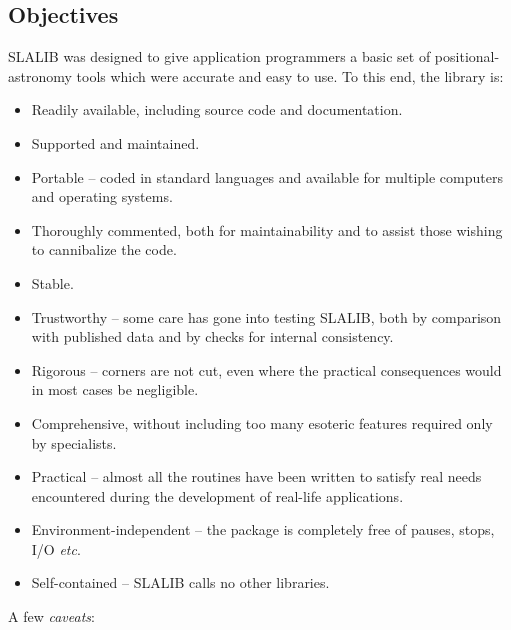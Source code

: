 \subsection{Objectives}
SLALIB was designed to give application programmers
a basic set of positional-astronomy tools which were
accurate and easy to use.  To this end, the library is:
\begin{itemize}
\item Readily available, including source code and documentation.
\item Supported and maintained.
\item Portable -- coded in standard languages and available for
multiple computers and operating systems.
\item Thoroughly commented, both for maintainability and to
assist those wishing to cannibalize the code.
\item Stable.
\item Trustworthy -- some care has gone into
testing SLALIB, both by comparison with published data and
by checks for internal consistency.
\item Rigorous -- corners are not cut,
even where the practical consequences would in most cases be
negligible.
\item Comprehensive, without including too many esoteric features
required only by specialists.
\item Practical -- almost all the routines have been written to
satisfy real needs encountered during the development of
real-life applications.
\item Environment-independent -- the package is
completely free of pauses, stops, I/O {\it etc}.
\item Self-contained -- SLALIB calls no other libraries.
\end{itemize}
A few {\it caveats}:
